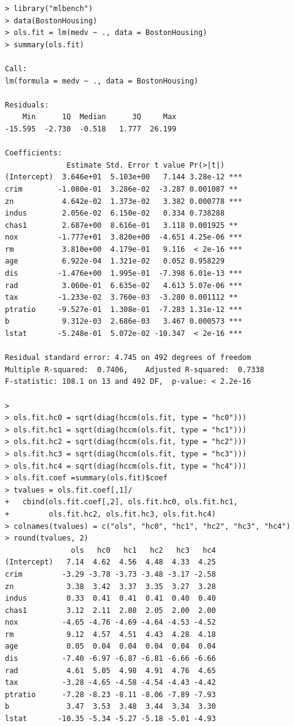\begin{lstlisting}
> library("mlbench")
> data(BostonHousing)
> ols.fit = lm(medv ~ ., data = BostonHousing)
> summary(ols.fit)

Call:
lm(formula = medv ~ ., data = BostonHousing)

Residuals:
    Min      1Q  Median      3Q     Max 
-15.595  -2.730  -0.518   1.777  26.199 

Coefficients:
              Estimate Std. Error t value Pr(>|t|)    
(Intercept)  3.646e+01  5.103e+00   7.144 3.28e-12 ***
crim        -1.080e-01  3.286e-02  -3.287 0.001087 ** 
zn           4.642e-02  1.373e-02   3.382 0.000778 ***
indus        2.056e-02  6.150e-02   0.334 0.738288    
chas1        2.687e+00  8.616e-01   3.118 0.001925 ** 
nox         -1.777e+01  3.820e+00  -4.651 4.25e-06 ***
rm           3.810e+00  4.179e-01   9.116  < 2e-16 ***
age          6.922e-04  1.321e-02   0.052 0.958229    
dis         -1.476e+00  1.995e-01  -7.398 6.01e-13 ***
rad          3.060e-01  6.635e-02   4.613 5.07e-06 ***
tax         -1.233e-02  3.760e-03  -3.280 0.001112 ** 
ptratio     -9.527e-01  1.308e-01  -7.283 1.31e-12 ***
b            9.312e-03  2.686e-03   3.467 0.000573 ***
lstat       -5.248e-01  5.072e-02 -10.347  < 2e-16 ***

Residual standard error: 4.745 on 492 degrees of freedom
Multiple R-squared:  0.7406,	Adjusted R-squared:  0.7338 
F-statistic: 108.1 on 13 and 492 DF,  p-value: < 2.2e-16

> 
> ols.fit.hc0 = sqrt(diag(hccm(ols.fit, type = "hc0")))
> ols.fit.hc1 = sqrt(diag(hccm(ols.fit, type = "hc1")))
> ols.fit.hc2 = sqrt(diag(hccm(ols.fit, type = "hc2")))
> ols.fit.hc3 = sqrt(diag(hccm(ols.fit, type = "hc3")))
> ols.fit.hc4 = sqrt(diag(hccm(ols.fit, type = "hc4")))
> ols.fit.coef =summary(ols.fit)$coef
> tvalues = ols.fit.coef[,1]/
+   cbind(ols.fit.coef[,2], ols.fit.hc0, ols.fit.hc1, 
+         ols.fit.hc2, ols.fit.hc3, ols.fit.hc4)
> colnames(tvalues) = c("ols", "hc0", "hc1", "hc2", "hc3", "hc4")
> round(tvalues, 2)
               ols   hc0   hc1   hc2   hc3   hc4
(Intercept)   7.14  4.62  4.56  4.48  4.33  4.25
crim         -3.29 -3.78 -3.73 -3.48 -3.17 -2.58
zn            3.38  3.42  3.37  3.35  3.27  3.28
indus         0.33  0.41  0.41  0.41  0.40  0.40
chas1         3.12  2.11  2.08  2.05  2.00  2.00
nox          -4.65 -4.76 -4.69 -4.64 -4.53 -4.52
rm            9.12  4.57  4.51  4.43  4.28  4.18
age           0.05  0.04  0.04  0.04  0.04  0.04
dis          -7.40 -6.97 -6.87 -6.81 -6.66 -6.66
rad           4.61  5.05  4.98  4.91  4.76  4.65
tax          -3.28 -4.65 -4.58 -4.54 -4.43 -4.42
ptratio      -7.28 -8.23 -8.11 -8.06 -7.89 -7.93
b             3.47  3.53  3.48  3.44  3.34  3.30
lstat       -10.35 -5.34 -5.27 -5.18 -5.01 -4.93
\end{lstlisting}


